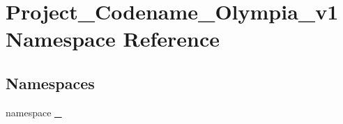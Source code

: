 \hypertarget{namespaceProject__Codename__Olympia__v1}{}\section{Project\+\_\+\+Codename\+\_\+\+Olympia\+\_\+v1 Namespace Reference}
\label{namespaceProject__Codename__Olympia__v1}
\subsection*{Namespaces}
\begin{DoxyCompactItemize}
\item 
namespace \hyperlink{namespaceProject__Codename__Olympia__v1_1_1__0}{\+\_}
\end{DoxyCompactItemize}

